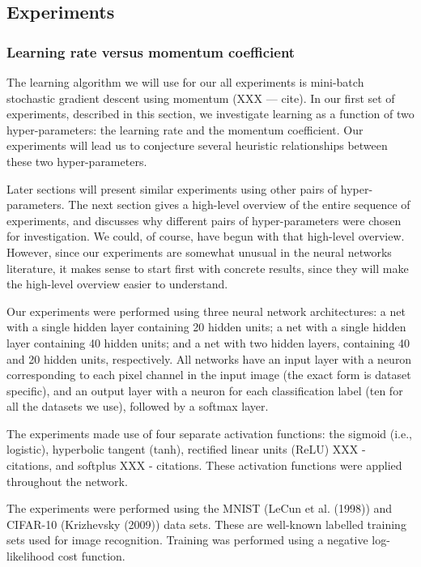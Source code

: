 \documentclass[10pt]{article}
\begin{document}
\subsection*{Experiments}

\subsubsection*{Learning rate versus momentum coefficient}

The learning algorithm we will use for our all experiments is
mini-batch stochastic gradient descent using momentum (XXX --- cite).
In our first set of experiments, described in this section, we
investigate learning as a function of two hyper-parameters: the
learning rate and the momentum coefficient.  Our experiments will lead
us to conjecture several heuristic relationships between these two
hyper-parameters.

Later sections will present similar experiments using other pairs of
hyper-parameters.  The next section gives a high-level overview of the
entire sequence of experiments, and discusses why different pairs of
hyper-parameters were chosen for investigation.  We could, of course,
have begun with that high-level overview.  However, since our
experiments are somewhat unusual in the neural networks literature, it
makes sense to start first with concrete results, since they will make
the high-level overview easier to understand.

Our experiments were performed using three neural network
architectures: a net with a single hidden layer containing 20 hidden
units; a net with a single hidden layer containing 40 hidden units;
and a net with two hidden layers, containing 40 and 20 hidden units,
respectively. All networks have an input layer with a neuron
corresponding to each pixel channel in the input image (the exact form
is dataset specific), and an output layer with a neuron for each
classification label (ten for all the datasets we use), followed by a
softmax layer.

The experiments made use of four separate activation functions: the
sigmoid (i.e., logistic), hyperbolic tangent (tanh), rectified linear
units (ReLU) XXX - citations, and softplus XXX - citations.  These
activation functions were applied throughout the network.

The experiments were performed using the MNIST (LeCun et al. (1998))
and CIFAR-10 (Krizhevsky (2009)) data sets.  These are well-known
labelled training sets used for image recognition.  Training was
performed using a negative log-likelihood cost function.
\end{document}
